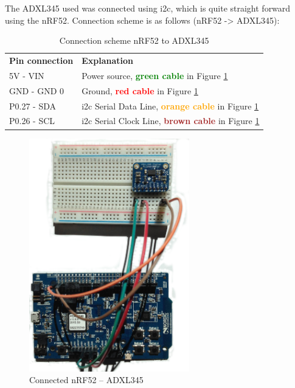 The \gls{ADXL345} used was connected using \gls{i2c}, which is quite straight forward using the nRF52. Connection scheme is as follows (nRF52 -> ADXL345): 

\begin{table}[H]
\centering
\caption{Connection scheme nRF52 to ADXL345}
\label{nRF52ADXL345connection}
\begin{tabular}{ll}
\textbf{Pin connection} & \textbf{Explanation}                                                                                            \\
5V - VIN               & Power source, \textbf{\textcolor{green}{green cable}} in Figure \ref{fig:nrf-adxl345}                   \\
GND - GND           0   & Ground, \textbf{\textcolor{red}{red cable}} in Figure \ref{fig:nrf-adxl345}                             \\
P0.27 - SDA            & \gls{i2c} Serial Data Line, \textbf{\textcolor{orange}{orange cable}} in Figure \ref{fig:nrf-adxl345} \\
P0.26 - SCL            & \gls{i2c} Serial Clock Line, \textbf{\textcolor{brown}{brown cable}} in Figure \ref{fig:nrf-adxl345} 
\end{tabular}
\end{table}



\begin{figure}[ht]
    \centering
    \includegraphics[width=0.62\textwidth]{connectionADXL-nrf4.png}    
    \caption{Connected nRF52 -- ADXL345}
    \label{fig:nrf-adxl345}
\end{figure}

